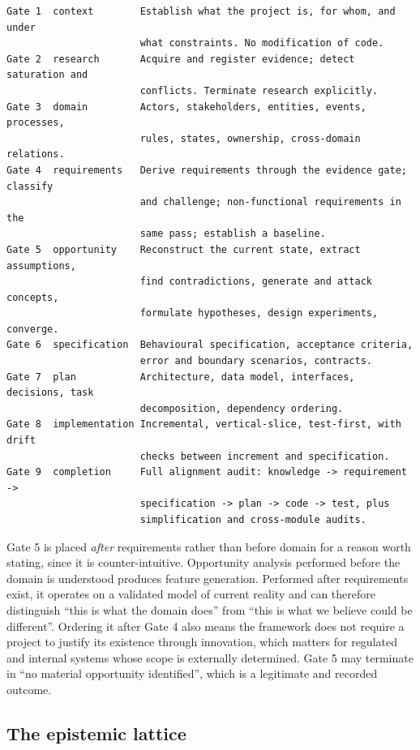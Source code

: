 \documentclass[11pt,a4paper]{article}
\begin{document}
\begin{Verbatim}[fontsize=\footnotesize,breaklines=true,breakanywhere=true,breakautoindent=false,samepage=false]
Gate 1  context        Establish what the project is, for whom, and under
                       what constraints. No modification of code.
Gate 2  research       Acquire and register evidence; detect saturation and
                       conflicts. Terminate research explicitly.
Gate 3  domain         Actors, stakeholders, entities, events, processes,
                       rules, states, ownership, cross-domain relations.
Gate 4  requirements   Derive requirements through the evidence gate; classify
                       and challenge; non-functional requirements in the
                       same pass; establish a baseline.
Gate 5  opportunity    Reconstruct the current state, extract assumptions,
                       find contradictions, generate and attack concepts,
                       formulate hypotheses, design experiments, converge.
Gate 6  specification  Behavioural specification, acceptance criteria,
                       error and boundary scenarios, contracts.
Gate 7  plan           Architecture, data model, interfaces, decisions, task
                       decomposition, dependency ordering.
Gate 8  implementation Incremental, vertical-slice, test-first, with drift
                       checks between increment and specification.
Gate 9  completion     Full alignment audit: knowledge -> requirement ->
                       specification -> plan -> code -> test, plus
                       simplification and cross-module audits.
\end{Verbatim}

Gate 5 is placed \emph{after} requirements rather than before domain for a reason worth stating, since it is counter-intuitive. Opportunity analysis performed before the domain is understood produces feature generation. Performed after requirements exist, it operates on a validated model of current reality and can therefore distinguish ``this is what the domain does'' from ``this is what we believe could be different''. Ordering it after Gate 4 also means the framework does not require a project to justify its existence through innovation, which matters for regulated and internal systems whose scope is externally determined. Gate 5 may terminate in ``no material opportunity identified'', which is a legitimate and recorded outcome.

\subsection{The epistemic lattice}
\end{document}
